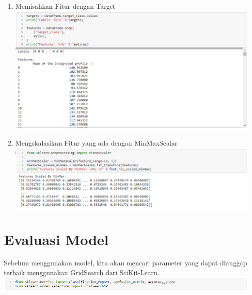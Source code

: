\documentclass[12pt]{article}
\begin{document}
    \begin{enumerate}
        
        \item Memisahkan Fitur dengan Target
        \newline \includegraphics[scale=0.5]{split-target-feature.png}
        
        \item Mengskalasikan Fitur yang ada dengan MinMaxScalar
        \newline \includegraphics[scale=0.5]{min-max-scalar.png}
        
    \end{enumerate}


\hspace{1 cm}

\newpage


\section{Evaluasi Model}

Sebelum menggunakan model, kita akan mencari parameter yang dapat dianggap terbaik menggunakan GridSearch dari SciKit-Learn.
\newline \includegraphics[scale=0.575]{ml-model.png}
\newline
\end{document}
